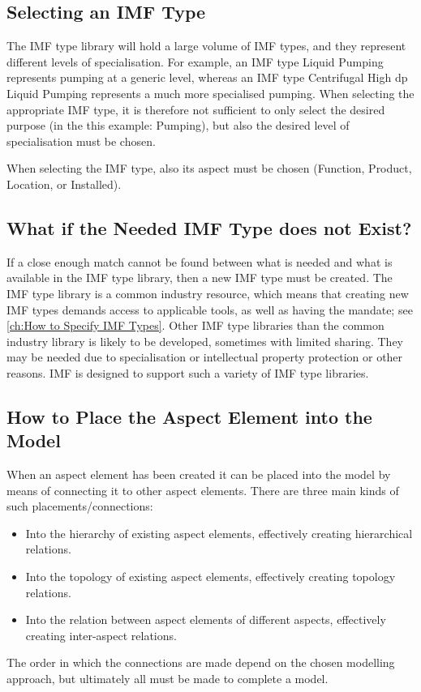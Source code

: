 \documentclass[../main.tex]{subfiles}
\begin{document}
\subsection{Selecting an IMF Type}
The IMF type library will hold a large volume of IMF types, and they represent different
levels of specialisation. For example, an IMF type Liquid Pumping represents pumping at a generic level, whereas an
IMF type Centrifugal High dp Liquid Pumping represents a much more specialised pumping. When selecting the
appropriate IMF type, it is therefore not sufficient to only select the desired purpose (in the this example: Pumping), but also the
desired level of specialisation must be chosen.

When selecting the IMF type, also its aspect must be chosen (Function, Product, Location, or Installed).

\subsection{What if the Needed IMF Type does not Exist?}
If a close enough match cannot be found between what is needed and what is available in
the IMF type library, then a new IMF type must be created. The IMF type library is a common industry resource, which
means that creating new IMF types demands access to applicable tools, as well as having the mandate; see \autoref{ch:How to Specify IMF Types}.
Other IMF type libraries than the common industry library is likely to be developed, sometimes with limited sharing.
They may be needed due to specialisation or intellectual property protection or other reasons. IMF is designed to
support such a variety of IMF type libraries.

\subsection{How to Place the Aspect Element into the Model}
When an aspect element has been created it can be placed into the model by
means of connecting it to other aspect elements. There are three main kinds of such placements/connections:

\begin{itemize}
  \item Into the hierarchy of existing aspect elements, effectively creating hierarchical relations.
  \item Into the topology of existing aspect elements, effectively creating topology relations.
  \item Into the relation between aspect elements of different aspects, effectively creating inter-aspect relations.
  \end{itemize}
  The order in which the connections are made depend on the chosen modelling approach, but ultimately all must
be made to complete a model.
\end{document}
